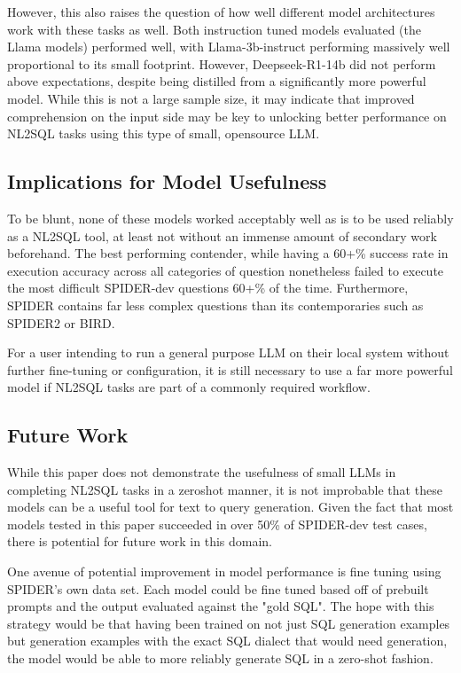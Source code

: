 \documentclass[sigconf]{acmart}
\begin{document}
However, this also raises the question of how well different model architectures work with these tasks as well. Both 
instruction tuned models evaluated (the Llama models) performed well, with Llama-3b-instruct performing massively
well proportional to its small footprint. However, Deepseek-R1-14b did not perform above expectations, despite being 
distilled from a significantly more powerful model. While this is not a large sample size, it may indicate that improved
comprehension on the input side may be key to unlocking better performance on NL2SQL tasks using this type of small, 
opensource LLM.

\subsection*{Implications for Model Usefulness}

To be blunt, none of these models worked acceptably well as is to be used reliably as a NL2SQL tool, at least not 
without an immense amount of secondary work beforehand. The best performing contender, while having a 60+\% success rate
in execution accuracy  across all categories of question nonetheless failed to execute the most difficult 
SPIDER-dev questions 60+\% of the time. Furthermore, SPIDER contains far less complex questions than its contemporaries
such as SPIDER2 or BIRD.

For a user intending to run a general purpose LLM on their local system without further fine-tuning or configuration, it
is still necessary to use a far more powerful model if NL2SQL tasks are part of a commonly required workflow. 

\subsection*{Future Work}

While this paper does not demonstrate the usefulness of small LLMs in completing NL2SQL tasks in a zeroshot manner, it
is not improbable that these models can be a useful tool for text to query generation. Given the fact that most models
tested in this paper succeeded in over 50\% of SPIDER-dev test cases, there is potential for future work in this domain.

One avenue of potential improvement in model performance is fine tuning using SPIDER's own data set. Each model could be 
fine tuned based off of prebuilt prompts and the output evaluated against the "gold SQL". The hope with this strategy
would be that having been trained on not just SQL generation examples but generation examples with the exact SQL dialect
that would need generation, the model would be able to more reliably generate SQL in a zero-shot fashion. 
\end{document}
